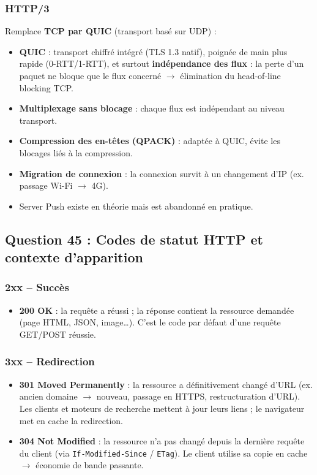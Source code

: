 \documentclass[12pt,a4paper]{article}
\begin{document}
\subsubsection*{HTTP/3 }
Remplace \textbf{TCP par QUIC} (transport bas\'e sur UDP) :
\begin{itemize}
  \item \textbf{QUIC} : transport chiffr\'e int\'egr\'e (TLS 1.3 natif), poign\'ee de main plus rapide (0-RTT/1-RTT), et surtout \textbf{ind\'ependance des flux} : la perte d'un paquet ne bloque que le flux concern\'e $\rightarrow$ \'elimination du head-of-line blocking TCP.
  \item \textbf{Multiplexage sans blocage} : chaque flux est ind\'ependant au niveau transport.
  \item \textbf{Compression des en-t\^etes (QPACK)} : adapt\'ee \`a QUIC, \'evite les blocages li\'es \`a la compression.
  \item \textbf{Migration de connexion} : la connexion survit \`a un changement d'IP (ex. passage Wi-Fi $\rightarrow$ 4G).
  \item Server Push existe en th\'eorie mais est abandonn\'e en pratique.
\end{itemize}

\subsection*{Question 45 : Codes de statut HTTP et contexte d'apparition}

\subsubsection*{2xx -- Succ\`es}
\begin{itemize}
  \item \textbf{200 OK} : la requ\^ete a r\'eussi ; la r\'eponse contient la ressource demand\'ee (page HTML, JSON, image\ldots). C'est le code par d\'efaut d'une requ\^ete GET/POST r\'eussie.
\end{itemize}

\subsubsection*{3xx -- Redirection}
\begin{itemize}
  \item \textbf{301 Moved Permanently} : la ressource a d\'efinitivement chang\'e d'URL (ex. ancien domaine $\rightarrow$ nouveau, passage en HTTPS, restructuration d'URL). Les clients et moteurs de recherche mettent \`a jour leurs liens ; le navigateur met en cache la redirection.
  \item \textbf{304 Not Modified} : la ressource n'a pas chang\'e depuis la derni\`ere requ\^ete du client (via \texttt{If-Modified-Since} / \texttt{ETag}). Le client utilise sa copie en cache $\rightarrow$ \'economie de bande passante.
\end{itemize}
\end{document}
